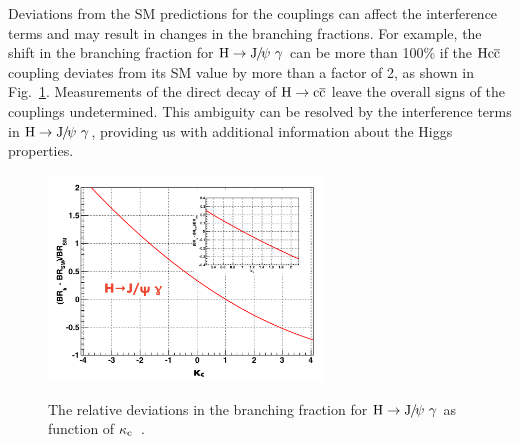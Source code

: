 Deviations from the SM predictions for the couplings can affect the interference terms and may result in changes in the branching fractions. 
For example, the shift in the branching fraction for $\PH\to\JPsi\ \gamma$ can be more than 100\% if the $\mathrm{H} \mathrm{c}\overline{\mathrm{c}}$ coupling deviates from its SM value by more than a factor of 2, as shown in Fig.~\ref{fig:BRShift}. 
Measurements of the direct decay of $\mathrm{H}\to\mathrm{c}\overline{\mathrm{c}}$ leave the overall signs of the couplings undetermined. This ambiguity can be resolved by the interference terms in $\PH\to\JPsi\ \gamma$, providing us with additional information about the Higgs properties.

\begin{figure}[!ht]
  \begin{center}  
    \includegraphics[width=0.65\textwidth]{Fig/BRShift}\\
    \caption{The relative deviations in the branching fraction for $\PH\to\JPsi\ \gamma$ as function of $\kappa_{\mathrm{c}}$~\cite{Bodwin:2013gca}.  \label{fig:BRShift}}  
  \end{center}
\end{figure}

%
%

